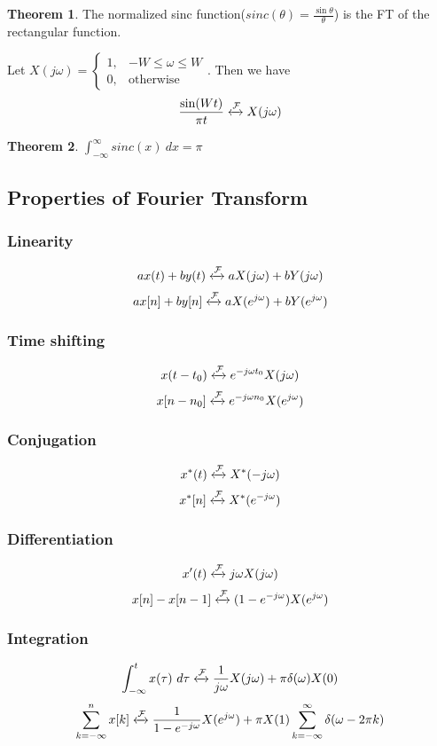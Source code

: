 \documentclass[10pt, a4paper]{extarticle}
\theoremstyle{definition}
\newtheorem*{thm}{Theorem}
\begin{document}
\begin{thm}
	The normalized sinc function($sinc(\theta)=\frac{\sin\theta}{\theta}$) is the FT of the rectangular function.
\end{thm}
Let $X(j\omega)=\begin{cases}
		1, & -W\leq\omega\leq W \\
		0, & \text{otherwise}
	\end{cases}$. Then we have\[\frac{\sin(Wt)}{\pi t}\xleftrightarrow{\mathcal{F}}X(j\omega)\]
\begin{thm}
	$\int_{-\infty}^{\infty}sinc(x)\ dx=\pi$
\end{thm}

\subsection{Properties of Fourier Transform}
\subsubsection{Linearity}
\[ax(t)+by(t)\xleftrightarrow{\mathcal{F}}aX(j\omega)+bY(j\omega)\]
\[ax[n]+by[n]\xleftrightarrow{\mathcal{F}}aX(e^{j\omega})+bY(e^{j\omega})\]
\subsubsection{Time shifting}
\[x(t-t_0)\xleftrightarrow{\mathcal{F}}e^{-j\omega t_0}X(j\omega)\]
\[x[n-n_0]\xleftrightarrow{\mathcal{F}}e^{-j\omega n_0}X(e^{j\omega})\]
\subsubsection{Conjugation}
\[x^*(t)\xleftrightarrow{\mathcal{F}}X^*(-j\omega)\]
\[x^*[n]\xleftrightarrow{\mathcal{F}}X^*(e^{-j\omega})\]
\subsubsection{Differentiation}
\[x'(t)\xleftrightarrow{\mathcal{F}}j\omega X(j\omega)\]
\[x[n]-x[n-1]\xleftrightarrow{\mathcal{F}}(1-e^{-j\omega})X(e^{j\omega})\]
\subsubsection{Integration}
\[\int_{-\infty}^t x(\tau)\ d\tau\xleftrightarrow{\mathcal{F}}\frac{1}{j\omega}X(j\omega)+\pi\delta(\omega)X(0)\]
\[\sum_{k=-\infty}^n x[k]\xleftrightarrow{\mathcal{F}}\frac{1}{1-e^{-j\omega}}X(e^{j\omega})+\pi X(1)\sum_{k=-\infty}^{\infty}\delta(\omega-2\pi k)\]
\end{document}
